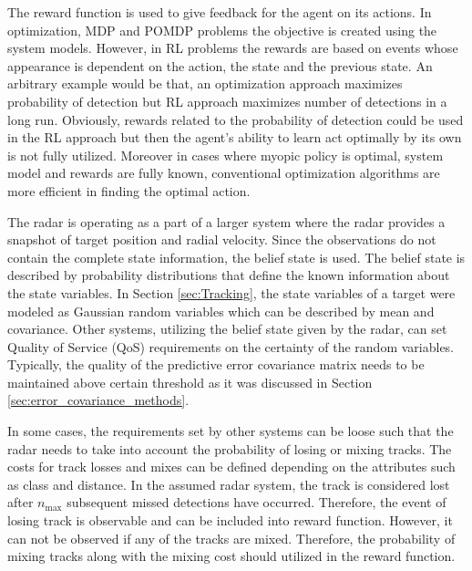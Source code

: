 \documentclass[english, 12pt, a4paper, elec, utf8, a-1b, online]{aaltothesis}
\newcommand{\nmax}{n_\text{max}}
\begin{document}
The reward function is used to give feedback for the agent on its actions.
In optimization, MDP and POMDP problems the objective is created using the system models.
However, in RL problems the rewards are based on events whose appearance is dependent on the action, the state and the previous state. 
An arbitrary example would be that, an optimization approach maximizes probability of detection but RL approach maximizes number of detections in a long run.
Obviously, rewards related to the probability of detection could be used in the RL approach but then the agent's ability to learn act optimally by its own is not fully utilized.
Moreover in cases where myopic policy is optimal, system model and rewards are fully known, conventional optimization algorithms are more efficient in finding the optimal action.

The radar is operating as a part of a larger system where the radar provides a snapshot of target position and radial velocity.
Since the observations do not contain the complete state information, the belief state is used.
The belief state is described by probability distributions that define the known information about the state variables.
In Section \ref{sec:Tracking}, the state variables of a target were modeled as Gaussian random variables which can be described by mean and covariance.
Other systems, utilizing the belief state given by the radar, can set Quality of Service (QoS) requirements on the certainty of the random variables.
Typically, the quality of the predictive error covariance matrix needs to be maintained above certain threshold as it was discussed in Section \ref{sec:error_covariance_methods}.

In some cases, the requirements set by other systems can be loose such that the radar needs to take into account the probability of losing or mixing tracks.
The costs for track losses and mixes can be defined depending on the attributes such as class and distance.
In the assumed radar system, the track is considered lost after $\nmax$ subsequent missed detections have occurred.
Therefore, the event of losing track is observable and can be included into reward function.
However, it can not be observed if any of the tracks are mixed.
Therefore, the probability of mixing tracks along with the mixing cost should utilized in the reward function.
\end{document}
